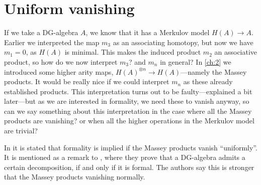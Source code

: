\section{Uniform vanishing}




If we take a DG-algebra $A$, we know that it has a Merkulov model $H(A)\longrightarrow A$. Earlier we interpreted the map $m_3$ as an associating homotopy, but now we have $m_1 = 0$, as $H(A)$ is minimal. This makes the induced product $m_2$ an associative product, so how do we now interpret $m_3$? and $m_n$ in general? In \cref{ch:2} we introduced some higher arity maps, $H(A)^{\otimes n}\longrightarrow H(A)$---namely the Massey products. It would be really nice if we could interpret $m_n$ as these already established products. This interpretation turns out to be faulty---explained a bit later---but as we are interested in formality, we need these to vanish anyway, so can we say something about this interpretation in the case where all the Massey products are vanishing? or when all the higher operations in the Merkulov model are trivial?

In \cite{DGMS} it is stated that formality is implied if the Massey products vanish ``uniformly''. It is mentioned as a remark to \cite[Theorem 4.1.]{DGMS}, where they prove that a DG-algebra admits a certain decomposition, if and only if it is formal. The authors say this is stronger that the Massey products vanishing normally. 




